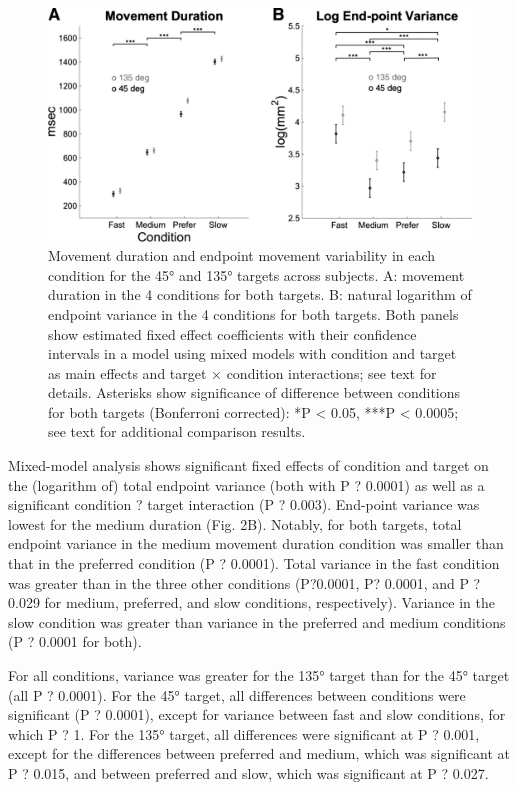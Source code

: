 \begin{figure}
	\centering
	\includegraphics[width=0.8\linewidth]{figures/MT-data}
	\caption[Movement duration and endpoint movement variability]{Movement duration and endpoint movement variability in each condition for the 45° and 135° targets across subjects. A: movement duration in the 4 conditions for both targets. B: natural logarithm of endpoint variance in the 4 conditions for both targets. Both panels show estimated fixed effect coefficients with their confidence intervals in a model using mixed models with condition and target as main effects and target × condition interactions; see text for details. Asterisks show significance of difference between conditions for both targets (Bonferroni corrected): *P < 0.05, ***P < 0.0005; see text for additional comparison results.}
	\label{fig:mt-data}
\end{figure}


Mixed-model analysis shows significant fixed effects of condition and target on the (logarithm of) total endpoint variance (both with P ? 0.0001) as well as a significant condition ? target interaction (P ? 0.003). End-point variance was lowest for the medium duration (Fig. 2B). Notably, for both targets, total endpoint variance in the medium movement duration condition was smaller than that in the preferred condition (P ? 0.0001). Total variance in the fast condition was greater than in the three other conditions (P?0.0001, P? 0.0001, and P ? 0.029 for medium, preferred, and slow conditions, respectively). Variance in the slow condition was greater than variance in the preferred and medium conditions (P ? 0.0001 for both).

For all conditions, variance was greater for the 135° target
than for the 45° target (all P ? 0.0001). For the 45° target, all differences between conditions were significant (P ? 0.0001), except for variance between fast and slow conditions, for which P ? 1. For the 135° target, all differences were significant at P ? 0.001, except for the differences between preferred and medium, which was significant at P ? 0.015, and between preferred and slow, which was significant at P ? 0.027.

